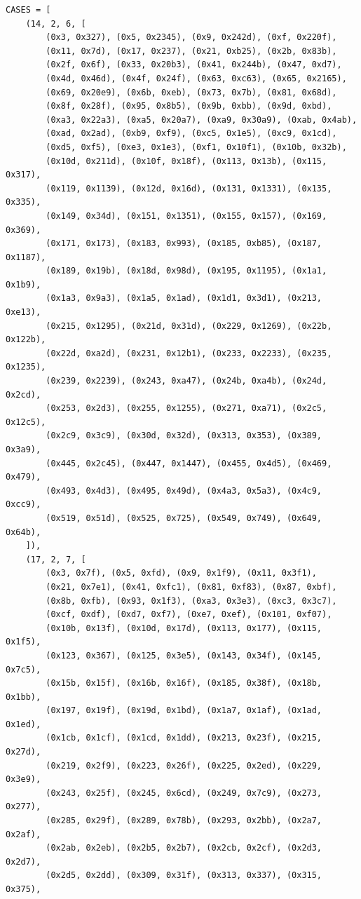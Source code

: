 \documentclass[11pt,a4paper]{article}
\begin{document}
\begin{lstlisting}
CASES = [
    (14, 2, 6, [
        (0x3, 0x327), (0x5, 0x2345), (0x9, 0x242d), (0xf, 0x220f),
        (0x11, 0x7d), (0x17, 0x237), (0x21, 0xb25), (0x2b, 0x83b),
        (0x2f, 0x6f), (0x33, 0x20b3), (0x41, 0x244b), (0x47, 0xd7),
        (0x4d, 0x46d), (0x4f, 0x24f), (0x63, 0xc63), (0x65, 0x2165),
        (0x69, 0x20e9), (0x6b, 0xeb), (0x73, 0x7b), (0x81, 0x68d),
        (0x8f, 0x28f), (0x95, 0x8b5), (0x9b, 0xbb), (0x9d, 0xbd),
        (0xa3, 0x22a3), (0xa5, 0x20a7), (0xa9, 0x30a9), (0xab, 0x4ab),
        (0xad, 0x2ad), (0xb9, 0xf9), (0xc5, 0x1e5), (0xc9, 0x1cd),
        (0xd5, 0xf5), (0xe3, 0x1e3), (0xf1, 0x10f1), (0x10b, 0x32b),
        (0x10d, 0x211d), (0x10f, 0x18f), (0x113, 0x13b), (0x115, 0x317),
        (0x119, 0x1139), (0x12d, 0x16d), (0x131, 0x1331), (0x135, 0x335),
        (0x149, 0x34d), (0x151, 0x1351), (0x155, 0x157), (0x169, 0x369),
        (0x171, 0x173), (0x183, 0x993), (0x185, 0xb85), (0x187, 0x1187),
        (0x189, 0x19b), (0x18d, 0x98d), (0x195, 0x1195), (0x1a1, 0x1b9),
        (0x1a3, 0x9a3), (0x1a5, 0x1ad), (0x1d1, 0x3d1), (0x213, 0xe13),
        (0x215, 0x1295), (0x21d, 0x31d), (0x229, 0x1269), (0x22b, 0x122b),
        (0x22d, 0xa2d), (0x231, 0x12b1), (0x233, 0x2233), (0x235, 0x1235),
        (0x239, 0x2239), (0x243, 0xa47), (0x24b, 0xa4b), (0x24d, 0x2cd),
        (0x253, 0x2d3), (0x255, 0x1255), (0x271, 0xa71), (0x2c5, 0x12c5),
        (0x2c9, 0x3c9), (0x30d, 0x32d), (0x313, 0x353), (0x389, 0x3a9),
        (0x445, 0x2c45), (0x447, 0x1447), (0x455, 0x4d5), (0x469, 0x479),
        (0x493, 0x4d3), (0x495, 0x49d), (0x4a3, 0x5a3), (0x4c9, 0xcc9),
        (0x519, 0x51d), (0x525, 0x725), (0x549, 0x749), (0x649, 0x64b),
    ]),
    (17, 2, 7, [
        (0x3, 0x7f), (0x5, 0xfd), (0x9, 0x1f9), (0x11, 0x3f1),
        (0x21, 0x7e1), (0x41, 0xfc1), (0x81, 0xf83), (0x87, 0xbf),
        (0x8b, 0xfb), (0x93, 0x1f3), (0xa3, 0x3e3), (0xc3, 0x3c7),
        (0xcf, 0xdf), (0xd7, 0xf7), (0xe7, 0xef), (0x101, 0xf07),
        (0x10b, 0x13f), (0x10d, 0x17d), (0x113, 0x177), (0x115, 0x1f5),
        (0x123, 0x367), (0x125, 0x3e5), (0x143, 0x34f), (0x145, 0x7c5),
        (0x15b, 0x15f), (0x16b, 0x16f), (0x185, 0x38f), (0x18b, 0x1bb),
        (0x197, 0x19f), (0x19d, 0x1bd), (0x1a7, 0x1af), (0x1ad, 0x1ed),
        (0x1cb, 0x1cf), (0x1cd, 0x1dd), (0x213, 0x23f), (0x215, 0x27d),
        (0x219, 0x2f9), (0x223, 0x26f), (0x225, 0x2ed), (0x229, 0x3e9),
        (0x243, 0x25f), (0x245, 0x6cd), (0x249, 0x7c9), (0x273, 0x277),
        (0x285, 0x29f), (0x289, 0x78b), (0x293, 0x2bb), (0x2a7, 0x2af),
        (0x2ab, 0x2eb), (0x2b5, 0x2b7), (0x2cb, 0x2cf), (0x2d3, 0x2d7),
        (0x2d5, 0x2dd), (0x309, 0x31f), (0x313, 0x337), (0x315, 0x375),

\end{lstlisting}
\end{document}
